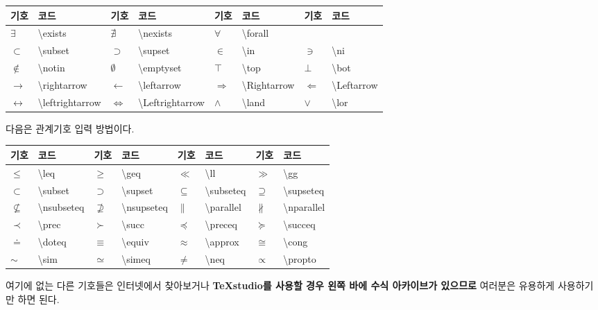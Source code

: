 \documentclass[12pt]{article}
\begin{document}
	\begin{tabularx}{\textwidth \onehalfspacing}{|l|X||l|X||l|X||l|X|}
		\hline
		기호&코드&기호&코드&기호&코드&기호&코드\\
		\hline
		\hline
		\(\exists\)&\textbackslash exists&
		\(\nexists\)&\textbackslash nexists&
		\(\forall\)&\textbackslash forall&
		&\\
		\hline
		\(\subset\)&\textbackslash subset&
		\(\supset\)&\textbackslash supset&
		\(\in\)&\textbackslash in&
		\(\ni\)&\textbackslash ni\\
		\hline
		\(\notin\)&\textbackslash notin &
		\(\emptyset \)&\textbackslash emptyset &
		\(\top\)&\textbackslash top &
		\(\bot\)&\textbackslash bot \\
		\hline
		\(\rightarrow\)&\textbackslash rightarrow &
		\(\leftarrow\)&\textbackslash leftarrow &
		\(\Rightarrow\)&\textbackslash Rightarrow &
		\(\Leftarrow\)&\textbackslash Leftarrow \\
		\hline
		\(\leftrightarrow\)&\small\textbackslash leftrightarrow &
		\(\Leftrightarrow \)&\small\textbackslash Leftrightarrow &
		\(\land\)&\textbackslash land &
		\(\lor\)&\textbackslash lor \\
		\hline
	\end{tabularx}
	\clearpage
	다음은 관계기호 입력 방법이다.\newline
	
	\begin{tabularx}{\textwidth \onehalfspacing}{|l|X||l|X||l|X||l|X|}
		\hline
		기호&코드&기호&코드&기호&코드&기호&코드\\
		\hline
		\hline
		\(\leq\)&\textbackslash leq &
		\(\geq\)&\textbackslash geq &
		\(\ll\)&\textbackslash ll &
		\(\gg\)&\textbackslash gg \\
		\hline
		\(\subset\)&\textbackslash subset &
		\(\supset\)&\textbackslash supset &
		\(\subseteq\)&\textbackslash subseteq &
		\(\supseteq\)&\textbackslash supseteq \\
		\hline
		\(\nsubseteq\)&\textbackslash nsubseteq &
		\(\nsupseteq\)&\textbackslash nsupseteq &
		\(\parallel\)&\textbackslash parallel &
		\(\nparallel\)&\textbackslash nparallel \\
		\hline
		\(\prec\)&\textbackslash prec &
		\(\succ\)&\textbackslash succ &
		\(\preceq\)&\textbackslash preceq &
		\(\succeq\)&\textbackslash succeq \\
		\hline
		\(\doteq\)&\textbackslash doteq &
		\(\equiv\)&\textbackslash equiv &
		\(\approx\)&\textbackslash approx &
		\(\cong\)&\textbackslash cong \\
		\hline
		\(\sim\)&\textbackslash sim &
		\(\simeq\)&\textbackslash simeq &
		\(\neq\)&\textbackslash neq &
		\(\propto\)&\textbackslash propto \\
		\hline
	\end{tabularx}
	\newline\newline
	여기에 없는 다른 기호들은 인터넷에서 찾아보거나 \textbf{\TeX studio를 사용할 경우 왼쪽 바에 수식 아카이브가 있으므로} 여러분은 유용하게 사용하기만 하면 된다.
\end{document}

